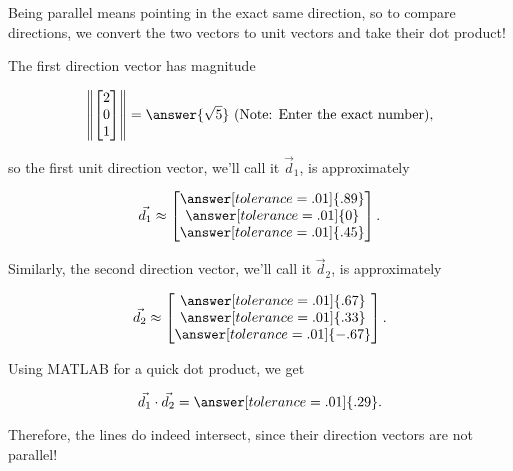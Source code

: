 \documentclass{ximera}
\begin{document}
\begin{example}
  Being parallel means pointing in the exact same direction, so to compare directions, we convert the two vectors to unit vectors and take their dot product!

  The first direction vector has magnitude 
  
  $$\norm{\begin{bmatrix} 2 \\ 0 \\ 1 \end{bmatrix}}=\answer{\sqrt{5}}\text{ (Note: Enter the exact number)},$$
  
  so the first unit direction vector, we'll call it $\vec{d}_1$, is approximately 

  $$\vec{d_1}\approx\begin{bmatrix}
    \answer[tolerance=.01]{.89}\\\answer[tolerance=.01]{0}\\\answer[tolerance=.01]{.45}
  \end{bmatrix}.$$

  Similarly, the second direction vector, we'll call it $\vec{d}_2$, is approximately

  $$\vec{d_2}\approx\begin{bmatrix}
    \answer[tolerance=.01]{.67}\\\answer[tolerance=.01]{.33}\\\answer[tolerance=.01]{-.67}
  \end{bmatrix}.$$  

  Using MATLAB for a quick dot product, we get 

  $$\vec{d_1}\cdot\vec{d_2}=\answer[tolerance=.01]{.29}.$$

  Therefore, the lines do indeed intersect, since their direction vectors are not parallel!
  

\end{example}
\end{document}
